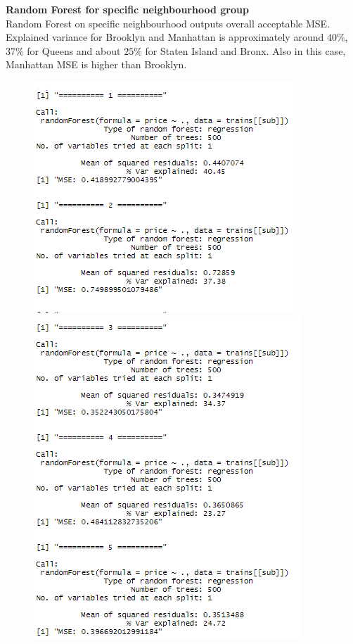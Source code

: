 \documentclass{FR16}
\begin{document}
\noindent \textbf{Random Forest for specific neighbourhood group}\\
Random Forest on specific neighbourhood outputs overall acceptable MSE. Explained variance for Brooklyn and Manhattan is approximately around $40\%$, $37\%$ for Queens and about $25\%$ for Staten Island and Bronx. Also in this case, Manhattan MSE is higher than Brooklyn.
\begin{figure}[!htb]
   \begin{minipage}{0.48\textwidth}
     \centering
     \includegraphics[width=1\linewidth]{figures/rf1.1.png} 
   \end{minipage}\hfill
   \begin{minipage}{0.48\textwidth}
     \centering
     \includegraphics[width=1\linewidth]{figures/rf1.2.png}

\end{minipage}
\end{figure}
\end{document}
